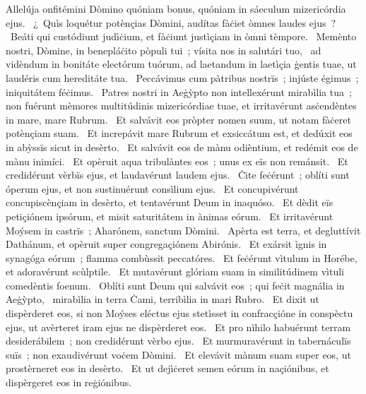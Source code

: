 { Allelúja}
{%
onfitémini Dòmino quóniam bonus, quóniam in sáeculum mizericórdia ejus. 
~¿~Quìs loquétur potènçias Dòmini, audítas fàċiet òmnes laudes ejus~? 
~Beáti qui custódiunt judìċium, et fàċiunt justìçiam in òmni tèmpore. 
~Memènto nostri, Dòmine, in benepláċito pòpuli tui~; vísita nos in salutári tuo, 
~ad vidèndum in bonitáte electórum tuórum, ad laetandum in laetìçia ġentis tuae, ut laudéris cum hereditáte tua. 
~Peccávimus cum pàtribus nostrïs~; injúste égimus~; iniquitátem féċimus. 
~Patres nostri in Aeġỳpto non intellexérunt mirabìlia tua~; non fuérunt mèmores multitúdinis mizericórdiae tuae, et irritavérunt asċendèntes in mare, mare Rubrum. 
~Et salvávit eos pròpter nomen suum, ut notam fàċeret potènçiam suam. 
~Et increpávit mare Rubrum et exsiccátum est, et dedúxit eos in abỳssïs sicut in desèrto. 
~Et salvávit eos de mànu odièntium, et redémit eos de mànu inimíci. 
~Et opèruit aqua tribulàntes eos~; unus ex eïs non remánsit. 
~Et credidérunt vèrbïs ejus, et laudavérunt laudem ejus. 
~Ċite feċérunt~; oblíti sunt óperum ejus, et non sustinuérunt consìlium ejus. 
~Et concupivérunt concupiscènçiam in desèrto, et tentavérunt Deum in inaquóso. 
~Et dèdit eïs petiçiónem ipsórum, et misit saturitátem in ànimas eórum. 
~Et irritavérunt Moýsem in castrïs~; Aharónem, sanctum Dòmini. 
~Apèrta est terra, et degluttívit Dathánum, et opèruit super congregaçiónem Abirónis. 
~Et exársit ìgnis in synagóga eórum~; flamma combùssit peccatóres. 
~Et feċérunt vìtulum in Horébe, et adoravérunt scùlptile. 
~Et mutavérunt glóriam suam in similitúdinem vìtuli comedèntis foenum. 
~Oblíti sunt Deum qui salvávit eos~; qui feċit magnália in Aeġỳpto, 
~mirabìlia in terra Ċami, terribìlia in mari Rubro. 
~Et dixit ut dispèrderet eos, si non Moýses eléctus ejus stetìsset in confracçióne in conspèctu ejus, ut avèrteret iram ejus ne dispèrderet eos. 
~Et pro nìhilo habuérunt terram desiderábilem~; non credidérunt vèrbo ejus. 
~Et murmuravérunt in tabernáculïs suïs~; non exaudivérunt voċem Dòmini. 
~Et elevávit mànum suam super eos, ut prostèrneret eos in desèrto. 
~Et ut dejìċeret semen eórum in naçiónibus, et dispèrgeret eos in reġiónibus. 
}
